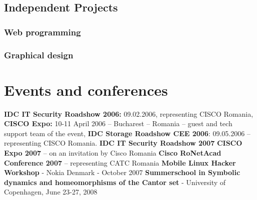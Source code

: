 \subsection{Independent Projects}
    \subsubsection{Web programming}


    \subsubsection{Graphical design}


\section{Events and conferences}
        \cvitem \textbf{IDC IT Security Roadshow 2006:} 09.02.2006, representing CISCO Romania,
        \cvitem \textbf{CISCO Expo:} 10-11 April 2006 – Bucharest – Romania – guest and tech support team of the event,
        \cvitem \textbf{IDC Storage Roadshow CEE 2006}: 09.05.2006 – representing CISCO Romania.
        \cvitem \textbf{IDC IT Security Roadshow 2007}
        \cvitem \textbf{CISCO Expo 2007} – on an invitation by Cisco Romania
        \cvitem \textbf{Cisco RoNetAcad Conference 2007} – representing CATC Romania
        \cvitem \textbf{Mobile Linux Hacker Workshop} - Nokia Denmark - October 2007
        \cvitem \textbf{Summerschool in Symbolic dynamics and homeomorphisms of the Cantor set} - University of Copenhagen, June 23-27, 2008


